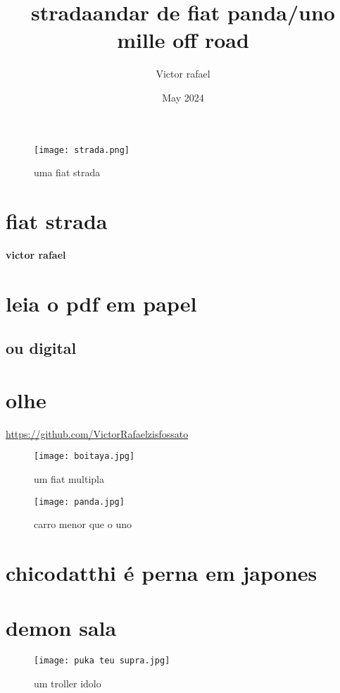 \documentclass{article}
\title{strada}
\author{Victor rafael}
\date{May 2024}
\begin{document}
\maketitle

\begin{figure}
    \centering
    \texttt{[image: strada.png]}
    \caption{uma fiat strada}
    \label{fig:enter-label}
\end{figure}


\newpage

\section{fiat strada} 

\textbf{victor rafael}

\newpage

\section{leia o pdf em papel}
\subsection{ou digital}

\newpage
\section{olhe}

\href{entre aqui:}{ https://github.com/VictorRafaelzisfossato}

\begin{figure}
    \centering
    \texttt{[image: boitaya.jpg]}
    \caption{um fiat multipla}
    \label{fig:enter-label}
\end{figure}

\newpage
\title{andar de fiat panda/uno mille off road}

\begin{figure}
    \centering
    \texttt{[image: panda.jpg]}
    \caption{carro menor que o uno}
    \label{fig:enter-label}
\end{figure}

\newpage

\section{chicodatthi é perna em japones}
\section{demon sala}
\begin{figure}
    \centering
    \texttt{[image: puka teu supra.jpg]}
    \caption{um troller idolo}
    \label{fig:enter-label}
\end{figure}
\end{document}
